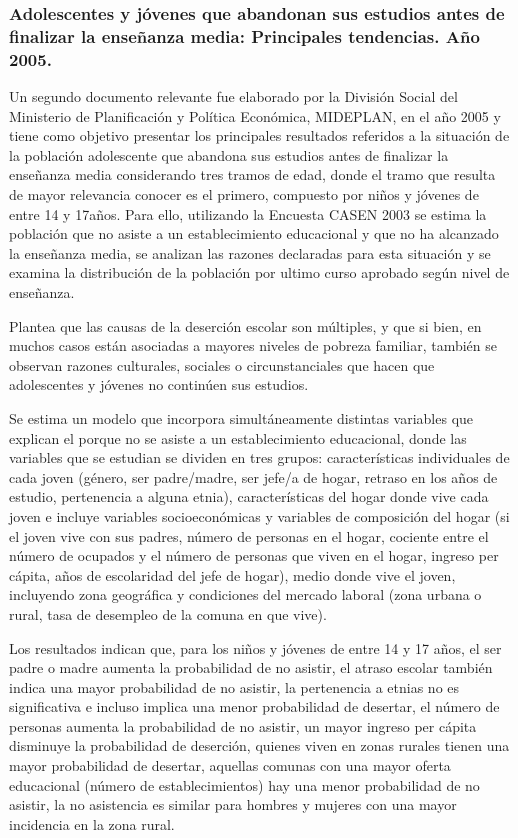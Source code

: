 \subsubsection{Adolescentes y jóvenes que abandonan sus estudios antes de finalizar la enseñanza media: Principales tendencias. Año 2005.} 
Un segundo documento relevante fue elaborado por la División Social del Ministerio de Planificación y Política Económica, MIDEPLAN, en el año 2005 y tiene como objetivo presentar los principales resultados referidos a la situación de la población adolescente que abandona sus estudios antes de finalizar la enseñanza media considerando tres tramos de edad, donde el tramo que resulta de mayor relevancia conocer es el primero, compuesto por niños y jóvenes de entre 14 y 17años. Para ello, utilizando la Encuesta CASEN 2003 se estima la población que no asiste a un establecimiento educacional y que no ha alcanzado la enseñanza media, se analizan las razones declaradas para esta situación y se examina  la distribución de la población por ultimo curso aprobado según nivel de enseñanza. 

Plantea que las causas de la deserción escolar son múltiples, y que si bien, en muchos casos están asociadas a mayores niveles de pobreza familiar, también se observan razones culturales, sociales o circunstanciales que hacen que adolescentes y jóvenes no continúen sus estudios.

Se estima un modelo que incorpora simultáneamente distintas variables que explican el porque no se asiste a un establecimiento educacional, donde las variables que se estudian se dividen en tres grupos: características individuales de cada joven (género, ser padre/madre, ser jefe/a de hogar, retraso en los años de estudio, pertenencia a alguna etnia), características del hogar donde vive cada joven e incluye variables socioeconómicas y variables de composición del hogar (si el joven vive con sus padres, número de personas en el hogar, cociente entre el número de ocupados y el número de personas que viven en el hogar, ingreso per cápita, años de escolaridad del jefe de hogar), medio donde vive el joven, incluyendo zona geográfica y condiciones del mercado laboral (zona urbana o rural, tasa de desempleo de la comuna en que vive).

Los resultados indican que, para los niños y jóvenes de entre 14 y 17 años,  el ser padre o madre aumenta la probabilidad de no asistir, el atraso escolar también indica una mayor probabilidad de no asistir, la pertenencia a etnias no es significativa e incluso implica una menor probabilidad de desertar, el número de personas aumenta la probabilidad de no asistir, un mayor ingreso per cápita disminuye la probabilidad de deserción, quienes viven en zonas rurales tienen una mayor probabilidad de desertar, aquellas comunas con una mayor oferta educacional (número de establecimientos) hay una menor probabilidad de no asistir, la no asistencia es similar para hombres y mujeres con una mayor incidencia en la zona rural.

